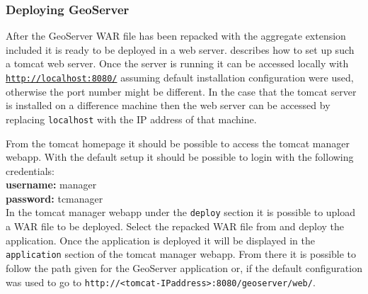 \subsubsection{Deploying GeoServer}
After the GeoServer WAR file has been repacked with the aggregate extension included it is ready to be deployed in a web server.  describes how to set up such a tomcat web server. Once the server is running it can be accessed locally with \href{http://localhost:8080/}{\lstinline|http://localhost:8080/|} assuming default installation configuration were used, otherwise the port number might be different. In the case that the tomcat server is installed on a difference machine then the web server can be accessed by replacing \lstinline|localhost| with the IP address of that machine.

From the tomcat homepage it should be possible to access the tomcat manager webapp. With the default setup it should be possible to login with the following credentials:\\
\indent \textbf{username:} manager \\
\indent \textbf{password:} tcmanager \\
In the tomcat manager webapp under the \lstinline|deploy| section it is possible to upload a WAR file to be deployed. Select the repacked WAR file from  and deploy the application. Once the application is deployed it will be displayed in the \lstinline|application| section of the tomcat manager webapp. From there it is possible to follow the path given for the GeoServer application or, if the default configuration was used to go to \mbox{\lstinline|http://<tomcat-IPaddress>:8080/geoserver/web/|}.
